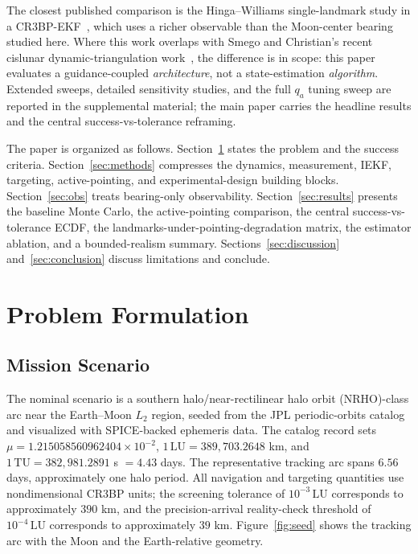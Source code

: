 \documentclass[10pt,twocolumn]{article}
\newcommand{\LU}{\mathrm{LU}}
\newcommand{\TU}{\mathrm{TU}}
\begin{document}
The closest published comparison is the Hinga--Williams single-landmark study in a CR3BP-EKF~\cite{hinga2023}, which uses a richer observable than the Moon-center bearing studied here.  Where this work overlaps with Smego and Christian's recent cislunar dynamic-triangulation work~\cite{smego2025}, the difference is in scope: this paper evaluates a guidance-coupled \emph{architecture}, not a state-estimation \emph{algorithm}.  Extended sweeps, detailed sensitivity studies, and the full $q_a$ tuning sweep are reported in the supplemental material; the main paper carries the headline results and the central success-vs-tolerance reframing.

The paper is organized as follows.  Section~\ref{sec:problem} states the problem and the success criteria.  Section~\ref{sec:methods} compresses the dynamics, measurement, IEKF, targeting, active-pointing, and experimental-design building blocks.  Section~\ref{sec:obs} treats bearing-only observability.  Section~\ref{sec:results} presents the baseline Monte Carlo, the active-pointing comparison, the central success-vs-tolerance ECDF, the landmarks-under-pointing-degradation matrix, the estimator ablation, and a bounded-realism summary.  Sections~\ref{sec:discussion} and~\ref{sec:conclusion} discuss limitations and conclude.

\section{Problem Formulation}
\label{sec:problem}

\subsection{Mission Scenario}
The nominal scenario is a southern halo/near-rectilinear halo orbit (NRHO)-class arc near the Earth--Moon $L_2$ region, seeded from the JPL periodic-orbits catalog and visualized with SPICE-backed ephemeris data.  The catalog record sets $\mu=1.215058560962404\times10^{-2}$, $1\,\LU=389{,}703.2648$ km, and $1\,\TU=382{,}981.2891$ s $= 4.43$ days.  The representative tracking arc spans $6.56$ days, approximately one halo period.  All navigation and targeting quantities use nondimensional CR3BP units; the screening tolerance of $10^{-3}\,\LU$ corresponds to approximately $390$ km, and the precision-arrival reality-check threshold of $10^{-4}\,\LU$ corresponds to approximately $39$ km.  Figure~\ref{fig:seed} shows the tracking arc with the Moon and the Earth-relative geometry.
\end{document}
